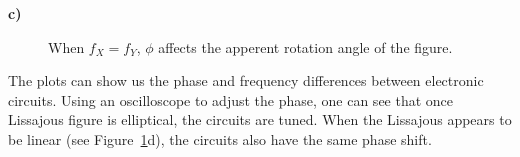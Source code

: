 \documentclass[12pt]{article}
\begin{document}
		\indent\textbf{\large c)}
		\begin{figure}[H]
			\centering
		\end{figure}
		\begin{figure}[ht]
			\renewcommand{\thesubfigure}{c}
			\renewcommand{\thesubfigure}{d}
			\caption{When $f_X = f_Y$, $\phi$ affects the apperent rotation angle of the figure.}\label{fig:3c}
		\end{figure}
	
		The plots can show us the phase and frequency differences between electronic circuits. Using an oscilloscope to adjust the phase, one can see that once Lissajous figure is elliptical, the circuits are tuned. When the Lissajous appears to be linear (see Figure~\ref{fig:3c}d), the circuits also have the same phase shift.
	
\end{document}
